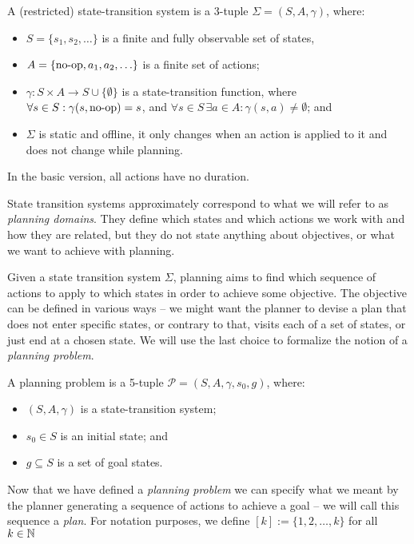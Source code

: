 \begin{defn}\label{defn:state-transition-sys}
A (restricted) state-transition system is a 3-tuple $\Sigma = (S, A, \gamma)$, where:
\begin{itemize}
\item $S = \{s_1, s_2, \ldots\}$ is a finite and fully observable set of states,
\item $A = \{\operatorname{\textrm{no-op}}, a_1, a_2, \ldots\}$ is a finite set of actions;
\item $\gamma: S \times A \to S \cup \{\emptyset\}$ is a state-transition function,
where $\forall s \in S : \gamma(s, \operatorname{\textrm{no-op}}) = s$,
and $\forall s \in S\,\exists a \in A : \gamma(s, a) \neq \emptyset$; and
\item $\Sigma$ is static and offline,
it only changes when an action is applied to it and does not change while planning.
\end{itemize}
In the basic version, all actions have no duration.
\end{defn}

State transition systems approximately correspond to what we will refer to as \textit{planning domains}.
They define which states and which actions we work with and how they
are related, but they do not state anything about objectives, or what
we want to achieve with planning.

Given a state transition system $\Sigma$, planning aims to find which
sequence of actions to apply to which states in order to achieve some objective.
The objective can be defined in various ways -- we might want the planner
to devise a plan that
does not enter specific states, or contrary to that, visits each of a set of states,
or just end at a chosen state.
We will use the last choice to formalize the notion of a \textit{planning problem}.

\begin{defn}\label{defn:planning-problem}\cite[Part~I]{Ghallab2004}
A planning problem is a 5-tuple $\mathcal{P} = (S, A, \gamma, s_0, g)$, where:
\begin{itemize}
\item $(S, A, \gamma)$ is a state-transition system;
\item $s_0 \in S$ is an initial state; and
\item $g \subseteq S$ is a set of goal states.
\end{itemize}
\end{defn}

Now that we have defined a \textit{planning problem} we can specify what we meant
by the planner generating a sequence of actions to achieve a goal -- we will
call this sequence a \textit{plan}.
For notation purposes, we define $[k] := \{1, 2, \ldots, k\}$ for all $k \in \mathbb{N}$

